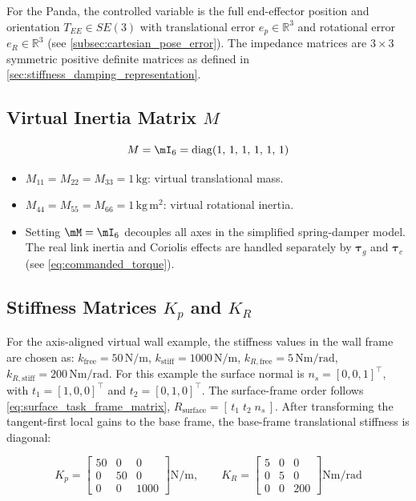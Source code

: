For the Panda, the controlled variable is the full end-effector position and orientation
$T_{EE}\in SE(3)$ with translational error
$e_p\in\mathbb{R}^3$ and rotational error
$e_R\in\mathbb{R}^3$ (see \cref{subsec:cartesian_pose_error}).
The impedance matrices are $3\times3$ symmetric positive definite matrices as
defined in
\cref{sec:stiffness_damping_representation}.

\subsection{\texorpdfstring{Virtual Inertia Matrix $M$}{Virtual Inertia Matrix M}}

\begin{equation}
\label{eq:M_panda}
M = \mI_6 =
\mathrm{diag}(1,\,1,\,1,\,1,\,1,\,1)
\end{equation}

\begin{itemize}
  \item $M_{11} = M_{22} = M_{33} = 1\,\mathrm{kg}$: virtual translational mass.
  \item $M_{44} = M_{55} = M_{66} = 1\,\mathrm{kg\,m^2}$: virtual rotational inertia.
  \item Setting $\mM = \mI_6$ decouples all axes in the simplified
        spring-damper model. The real link inertia and Coriolis effects are handled separately by
        $\bm{\tau}_g$ and $\bm{\tau}_c$ (see \cref{eq:commanded_torque}).
\end{itemize}

\subsection{\texorpdfstring{Stiffness Matrices $K_p$ and $K_R$}{Stiffness Matrices Kp and KR}}

For the axis-aligned virtual wall example, the stiffness values in the wall
frame are chosen as:
$k_{\mathrm{free}}=50\,\mathrm{N/m}$,
$k_{\mathrm{stiff}}=1000\,\mathrm{N/m}$,
$k_{R,\mathrm{free}}=5\,\mathrm{Nm/rad}$,
$k_{R,\mathrm{stiff}}=200\,\mathrm{Nm/rad}$.
For this example the surface normal is \(n_s=[0,0,1]^\top\), with
\(t_1=[1,0,0]^\top\) and \(t_2=[0,1,0]^\top\). The surface-frame order follows
\cref{eq:surface_task_frame_matrix}, \(R_{\mathrm{surface}}=[\,t_1\;t_2\;n_s\,]\).
After transforming the tangent-first local gains to the base frame, the
base-frame translational stiffness is diagonal:

\begin{equation}
\label{eq:K_panda}
K_p =
\begin{bmatrix}
50   & 0  & 0    \\
0    & 50 & 0    \\
0    & 0  & 1000
\end{bmatrix}
\mathrm{N/m},
\qquad
K_R =
\begin{bmatrix}
5 & 0 & 0 \\
0 & 5 & 0 \\
0 & 0 & 200
\end{bmatrix}
\mathrm{Nm/rad}
\end{equation}

